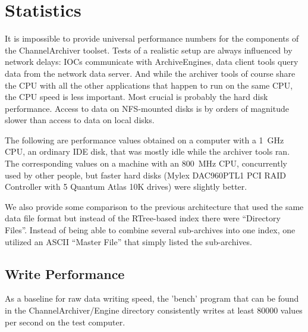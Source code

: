 \section{Statistics}
It is impossible to provide universal performance numbers for the
components of the ChannelArchiver toolset. Tests of a realistic setup
are always influenced by network delays: IOCs communicate with ArchiveEngines,
data client tools query data from the network data server.
And while the archiver tools of course share the CPU with all the
other applications that happen to run on the same CPU,
the CPU speed is less important. Most crucial is probably the hard
disk performance. Access to data on NFS-mounted disks is by orders of
magnitude slower than access to data on local disks.

The following are performance values obtained on a computer
with a 1~GHz CPU, an ordinary IDE disk, that was mostly idle
while the archiver tools ran. %
The corresponding values on a machine with an 800~MHz CPU, concurrently
used by other people, but faster hard disks (Mylex
DAC960PTL1 PCI RAID Controller with 5 Quantum Atlas 10K drives) were
slightly better.

We also provide some comparison to the previous architecture that used
the same data file format but instead of the RTree-based index there
were ``Directory Files''. Instead of being able to combine several sub-archives
into one index, one utilized an ASCII ``Master File'' that simply listed the
sub-archives.

\subsection{Write Performance}
As a baseline for raw data writing speed, the 'bench' program that can
be found in the ChannelArchiver/Engine directory consistently writes
at least 80000 values per second on the test computer.

